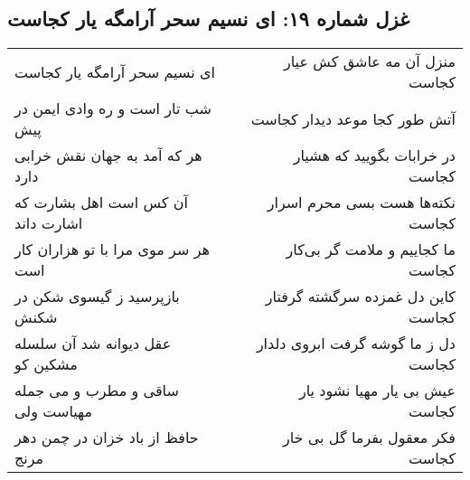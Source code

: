 \begin{center}
\section*{غزل شماره ۱۹: ای نسیم سحر آرامگه یار کجاست}
\label{sec:sh019}
\begin{longtable}{l p{0.5cm} r}
ای نسیم سحر آرامگه یار کجاست
&&
منزل آن مه عاشق کش عیار کجاست
\\
شب تار است و ره وادی ایمن در پیش
&&
آتش طور کجا موعد دیدار کجاست
\\
هر که آمد به جهان نقش خرابی دارد
&&
در خرابات بگویید که هشیار کجاست
\\
آن کس است اهل بشارت که اشارت داند
&&
نکته‌ها هست بسی محرم اسرار کجاست
\\
هر سر موی مرا با تو هزاران کار است
&&
ما کجاییم و ملامت گر بی‌کار کجاست
\\
بازپرسید ز گیسوی شکن در شکنش
&&
کاین دل غمزده سرگشته گرفتار کجاست
\\
عقل دیوانه شد آن سلسله مشکین کو
&&
دل ز ما گوشه گرفت ابروی دلدار کجاست
\\
ساقی و مطرب و می جمله مهیاست ولی
&&
عیش بی یار مهیا نشود یار کجاست
\\
حافظ از باد خزان در چمن دهر مرنج
&&
فکر معقول بفرما گل بی خار کجاست
\\
\end{longtable}
\end{center}
